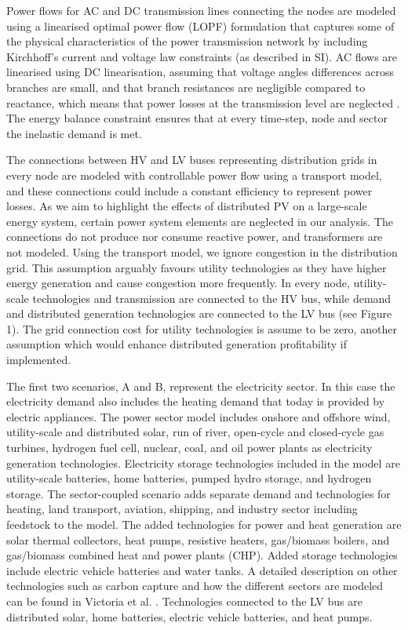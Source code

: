 \documentclass[review]{elsarticle}
\begin{document}
	
	
	Power flows for AC and DC transmission lines connecting the nodes are modeled using a linearised optimal power flow (LOPF) formulation that captures some of the physical characteristics of the power transmission network by including Kirchhoff’s current and voltage law constraints (as described in SI). AC flows are linearised using DC linearisation, assuming that voltage angles differences across branches are small, and that branch resistances are negligible compared to reactance, which means that power losses at the transmission level are neglected \cite{brown_2017,neumann2022assessments,pypsa_2016}. The energy balance constraint ensures that at every time-step, node and sector the inelastic demand is met. 
	
	The connections between HV and LV buses representing distribution grids in every node are modeled with controllable power flow using a transport model, and these connections could include a constant efficiency to represent power losses. As we aim to highlight the effects of distributed PV on a large-scale energy system, certain power system elements are neglected in our analysis. The connections do not produce nor consume reactive power, and  transformers are not modeled. Using the transport model, we ignore congestion in the distribution grid. This assumption arguably favours utility technologies as they have higher energy generation and cause congestion more frequently. In every node, utility-scale technologies and transmission are connected to the HV bus, while demand and distributed generation technologies are connected to the LV bus (see Figure 1). The grid connection cost for utility technologies is assume to be zero, another assumption which would enhance distributed generation profitability if implemented. 
	
	The first two scenarios, A and B, represent the electricity sector. In this case the electricity demand also includes the heating demand that today is provided by electric appliances. The power sector model includes onshore and offshore wind, utility-scale and distributed solar, run of river, open-cycle and closed-cycle gas turbines, hydrogen fuel cell, nuclear, coal, and oil power plants as electricity generation technologies. Electricity storage technologies included in the model are utility-scale batteries, home batteries, pumped hydro storage, and hydrogen storage. The sector-coupled scenario adds separate demand and technologies for heating, land transport, aviation, shipping, and industry sector including feedstock to the model. The added technologies for power and heat generation are solar thermal collectors, heat pumps, resistive heaters, gas/biomass boilers, and gas/biomass combined heat and power plants (CHP). Added storage technologies include electric vehicle batteries and water tanks. A detailed description on other technologies such as carbon capture and how the different sectors are modeled can be found in Victoria et al. \cite{victoria_2022}. Technologies connected to the LV bus are distributed solar, home batteries, electric vehicle batteries, and heat pumps.
	
\end{document}
